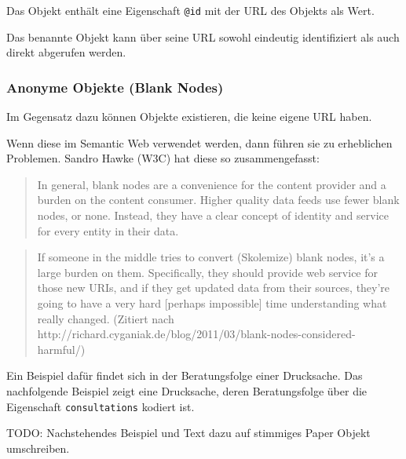 \documentclass[,a4paper]{article}
\begin{document}
Das Objekt enthält eine Eigenschaft \texttt{@id} mit der URL des Objekts
als Wert.

Das benannte Objekt kann über seine URL sowohl eindeutig identifiziert
als auch direkt abgerufen werden.

\subsubsection{Anonyme Objekte (Blank
Nodes)}\label{anonyme-objekte-blank-nodes}

Im Gegensatz dazu können Objekte existieren, die keine eigene URL haben.

Wenn diese im Semantic Web verwendet werden, dann führen sie zu
erheblichen Problemen. Sandro Hawke (W3C) hat diese so zusammengefasst:

\begin{quote}
In general, blank nodes are a convenience for the content provider and a
burden on the content consumer. Higher quality data feeds use fewer
blank nodes, or none. Instead, they have a clear concept of identity and
service for every entity in their data.
\end{quote}

\begin{quote}
If someone in the middle tries to convert (Skolemize) blank nodes, it's
a large burden on them. Specifically, they should provide web service
for those new URIs, and if they get updated data from their sources,
they're going to have a very hard {[}perhaps impossible{]} time
understanding what really changed. (Zitiert nach
http://richard.cyganiak.de/blog/2011/03/blank-nodes-considered-harmful/)
\end{quote}

Ein Beispiel dafür findet sich in der Beratungsfolge einer Drucksache.
Das nachfolgende Beispiel zeigt eine Drucksache, deren Beratungsfolge
über die Eigenschaft \texttt{consultations} kodiert ist.

TODO: Nachstehendes Beispiel und Text dazu auf stimmiges Paper Objekt
umschreiben.
\end{document}
